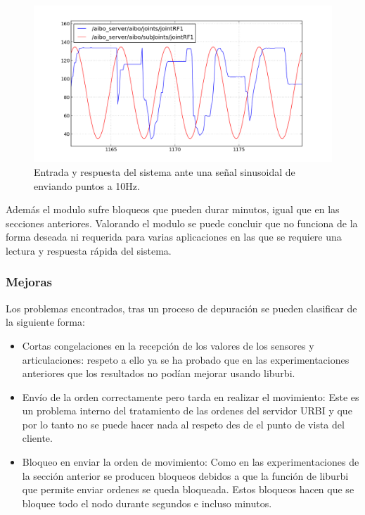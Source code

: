 \documentclass[12pt,a4paper,final,twoside]{book}
\begin{document}
   \begin{figure}[H]
	\centering
    \includegraphics[scale=0.66]{images/sinlegWR/10Ry10SAll.png}
 	\caption{Entrada y respuesta del sistema ante una señal sinusoidal de enviando puntos a 10Hz.}
  \label{fig:ASsin10Hz}
\end{figure}

Además el modulo sufre bloqueos que pueden durar minutos, igual que en las secciones anteriores.
Valorando el modulo se puede concluir que no funciona de la forma deseada ni requerida para varias aplicaciones en las que se requiere una lectura y respuesta rápida del sistema. 

\subsubsection{Mejoras}
Los problemas encontrados, tras un proceso de depuración se pueden clasificar de la siguiente forma:
\begin{itemize}
\item Cortas congelaciones en la recepción de los valores de los sensores y articulaciones: respeto a ello ya se ha probado que en las experimentaciones anteriores que los resultados no podían mejorar usando liburbi.
\item Envío de la orden correctamente pero tarda en realizar el movimiento: Este es un problema interno del tratamiento de las ordenes del servidor URBI y que por lo tanto no se puede hacer nada al respeto des de el punto de vista del cliente.
\item Bloqueo en enviar la orden de movimiento: Como en las experimentaciones de la sección anterior se producen bloqueos debidos a que la función de liburbi que permite enviar ordenes se queda bloqueada. Estos bloqueos hacen que se bloquee todo el nodo durante segundos e incluso minutos.
\end{itemize}
\end{document}
